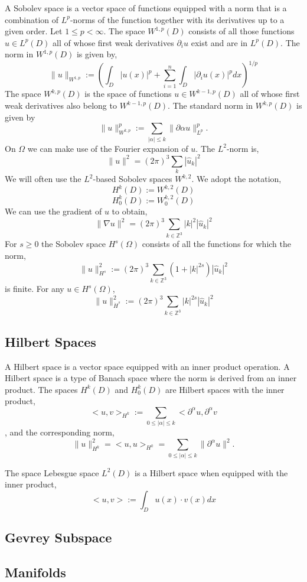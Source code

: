 \documentclass[12pt]{article}
\begin{document}
\begin{flushleft}
\qquad A Sobolev space is a vector space of functions equipped with a norm that is a combination of $L^p$-norms of the function together with its derivatives up to a given order. Let $1\leq p <\infty$. The space $W^{1,p}(D)$ consists of all those functions $u\in L^p(D)$ all of whose first weak derivatives $\partial_i u$ exist and are in $L^p(D)$. The norm in $W^{1,p}(D)$ is given by,
$$\|u\|_{W^{1,p}} := \left( \int_D |u(x)|^p + \sum_{i=1}^n \int_D |\partial_i u(x)|^p dx \right)^{1/p}$$
The space $W^{k,p}(D)$ is the space of functions $u\in W^{k-1,p}(D)$ all of whose first weak derivatives also belong to $W^{k-1,p}(D)$. The standard norm in $W^{k,p}(D)$ is given by
$$\|u\|_{W^{k,p}}^p := \sum_{|\alpha|\leq k}\|\partial \alpha u\|_{L^p}^p.$$
On $\Omega$ we can make use of the Fourier expansion of $u$. The $L^2$-norm is,
$$\|u\|^2 = (2\pi)^3\sum_k|\hat{u}_k|^2$$
We will often use the $L^2$-based Sobolev spaces $W^{k,2}$. We adopt the notation,
$$H^k(D) := W^{k,2}(D)$$
$$H_0^k(D) := W_0^{k,2}(D)$$
We can use the gradient of $u$ to obtain,
$$\|\nabla u\|^2 = (2\pi)^3\sum_{k\in \mathbb{Z}^3}|k|^2|\hat{u}_k|^2$$
For $s\geq 0$ the Sobolev space $H^s(\Omega)$ consists of all the functions for which the norm,
$$\|u\|_{H^s}^2 := (2\pi)^3\sum_{k\in\mathbb{Z}^3}(1+|k|^{2s})|\hat{u}_k|^2$$
is finite. For any $u\in H^s(\Omega)$,
$$\|u\|_{\dot{H}^s}^2 := (2\pi)^3 \sum_{k\in\mathbb{Z}^3}|k|^{2s}|\hat{u}_k|^2$$

\subsection{Hilbert Spaces}

\qquad A Hilbert space is a vector space equipped with an inner product operation. A Hilbert space is a type of Banach space where the norm is derived from an inner product. The spaces $H^k(D)$ and $H_0^k(D)$ are Hilbert spaces with the inner product,
$$<u,v>_{H^k} := \sum_{0\leq |\alpha|\leq k}<\partial^\alpha u, \partial^\alpha v$$,
and the corresponding norm,
$$\|u\|_{H^k}^2 = <u,u>_{H^k} = \sum_{0\leq |\alpha|\leq k}\|\partial^\alpha u\|^2.$$

The space Lebesgue space $L^2(D)$ is a Hilbert space when equipped with the inner product,
$$<u,v> := \int_D u(x)\cdot v(x) dx$$

\subsection{Gevrey Subspace} 
\subsection{Manifolds}


\end{flushleft}
\end{document}

